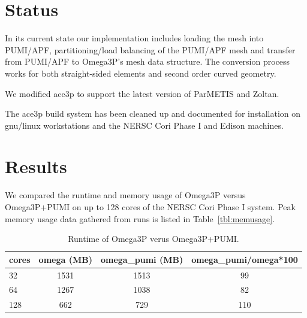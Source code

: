 \documentclass[a4paper]{article}
\begin{document}
\section{Status}
In its current state our implementation includes loading the mesh into PUMI/APF, partitioning/load balancing of the PUMI/APF mesh and transfer from PUMI/APF to Omega3P's mesh data structure. The conversion process works for both straight-sided elements and second order curved geometry.

We modified ace3p to support the latest version of ParMETIS and Zoltan.

The ace3p build system has been cleaned up and documented for installation on
gnu/linux workstations and the NERSC Cori Phase I and Edison machines.

\section{Results}

We compared the runtime and memory usage of Omega3P versus Omega3P+PUMI on
up to 128 cores of the NERSC Cori Phase I system.
Peak memory usage data gathered from runs is listed in Table~\ref{tbl:memusage}.

\begin{table}[h]
\centering
  \caption{Runtime of Omega3P verus Omega3P+PUMI.}
\label{tbl:time}
  \begin{tabular}{l|ccc}
    cores & omega (MB) & omega\_pumi (MB) & omega\_pumi/omega*100 \\
    \hline
    32    & 1531       & 1513             & 99                    \\
    64    & 1267       & 1038             & 82                    \\
    128   & 662        & 729              & 110
\end{tabular}
\end{table}

\newpage


\end{document}
